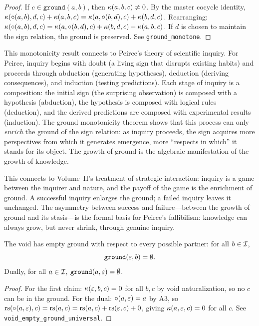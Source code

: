 \begin{proof}
If $c \in \texttt{ground}(a, b)$, then $\kappa(a, b, c) \neq 0$. By the master cocycle identity, $\kappa(\circ(a, b), d, c) + \kappa(a, b, c) = \kappa(a, \circ(b, d), c) + \kappa(b, d, c)$. Rearranging: $\kappa(\circ(a,b), d, c) = \kappa(a, \circ(b,d), c) + \kappa(b, d, c) - \kappa(a, b, c)$. If $d$ is chosen to maintain the sign relation, the ground is preserved. See \texttt{ground\_monotone}.
\end{proof}

\begin{remark}
This monotonicity result connects to Peirce's theory of scientific inquiry. For Peirce, inquiry begins with doubt (a living sign that disrupts existing habits) and proceeds through abduction (generating hypotheses), deduction (deriving consequences), and induction (testing predictions). Each stage of inquiry is a composition: the initial sign (the surprising observation) is composed with a hypothesis (abduction), the hypothesis is composed with logical rules (deduction), and the derived predictions are composed with experimental results (induction). The ground monotonicity theorem shows that this process can only \emph{enrich} the ground of the sign relation: as inquiry proceeds, the sign acquires more perspectives from which it generates emergence, more ``respects in which'' it stands for its object. The growth of ground is the algebraic manifestation of the growth of knowledge.

This connects to Volume~II's treatment of strategic interaction: inquiry is a game between the inquirer and nature, and the payoff of the game is the enrichment of ground. A successful inquiry enlarges the ground; a failed inquiry leaves it unchanged. The asymmetry between success and failure---between the growth of ground and its stasis---is the formal basis for Peirce's fallibilism: knowledge can always grow, but never shrink, through genuine inquiry.
\end{remark}

\begin{theorem}
\label{thm:void-universal-empty-ground}
The void has empty ground with respect to every possible partner: for all $b \in \mathcal{I}$,
\[
  \texttt{ground}(\varepsilon, b) = \emptyset.
\]
Dually, for all $a \in \mathcal{I}$, $\texttt{ground}(a, \varepsilon) = \emptyset$.
\end{theorem}

\begin{proof}
For the first claim: $\kappa(\varepsilon, b, c) = 0$ for all $b, c$ by void naturalization, so no $c$ can be in the ground. For the dual: $\circ(a, \varepsilon) = a$ by A3, so $\mathrm{rs}(\circ(a, \varepsilon), c) = \mathrm{rs}(a, c) = \mathrm{rs}(a, c) + \mathrm{rs}(\varepsilon, c) + 0$, giving $\kappa(a, \varepsilon, c) = 0$ for all $c$. See \texttt{void\_empty\_ground\_universal}.
\end{proof}

